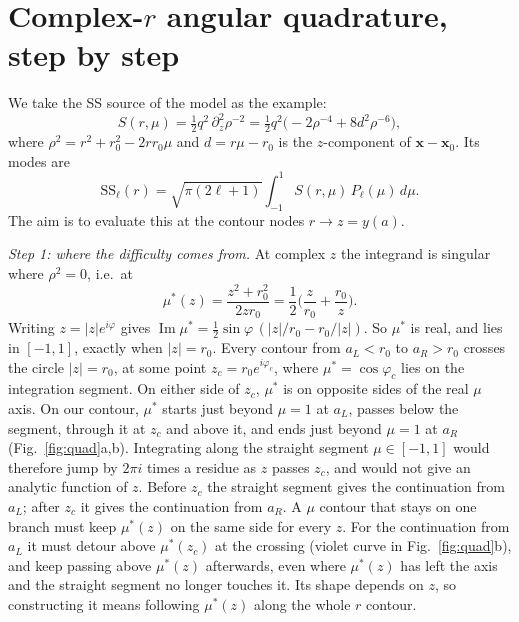 \documentclass[aps,prl,twocolumn,superscriptaddress,nofootinbib,floatfix]{revtex4-2}
\renewcommand{\Im}{\operatorname{Im}}
\newcommand{\x}{\mathbf{x}}
\begin{document}
\section{Complex-\texorpdfstring{$r$}{r} angular quadrature, step by step}\label{app:quadrature}
We take the SS source of the model as the example:
\begin{equation}
S(r,\mu)=\tfrac12q^2\,\partial_z^2\rho^{-2}=\tfrac12q^2\big(-2\rho^{-4}+8d^2\rho^{-6}\big),
\end{equation}
where $\rho^2=r^2+r_0^2-2rr_0\mu$ and $d=r\mu-r_0$ is the $z$-component of $\x-\x_0$.
Its modes are
\begin{equation}
\mathrm{SS}_\ell(r)=\sqrt{\pi(2\ell+1)}\int_{-1}^{1}S(r,\mu)\,P_\ell(\mu)\,d\mu.
\label{eq:SSmode}
\end{equation}
The aim is to evaluate this at the contour nodes $r\to z=y(a)$.

\emph{Step 1: where the difficulty comes from.}
At complex $z$ the integrand is singular where $\rho^2=0$, i.e.\ at
\begin{equation}
\mu^*(z)=\frac{z^2+r_0^2}{2zr_0}=\frac12\Big(\frac{z}{r_0}+\frac{r_0}{z}\Big).
\end{equation}
Writing $z=|z|e^{i\varphi}$ gives $\Im\mu^*=\tfrac12\sin\varphi\,(|z|/r_0-r_0/|z|)$.
So $\mu^*$ is real, and lies in $[-1,1]$, exactly when $|z|=r_0$.
Every contour from $a_L<r_0$ to $a_R>r_0$ crosses the circle $|z|=r_0$, at some point $z_c=r_0e^{i\varphi_c}$, where $\mu^*=\cos\varphi_c$ lies on the integration segment.
On either side of $z_c$, $\mu^*$ is on opposite sides of the real $\mu$ axis.
On our contour, $\mu^*$ starts just beyond $\mu=1$ at $a_L$, passes below the segment, through it at $z_c$ and above it, and ends just beyond $\mu=1$ at $a_R$ (Fig.~\ref{fig:quad}a,b).
Integrating along the straight segment $\mu\in[-1,1]$ would therefore jump by $2\pi i$ times a residue as $z$ passes $z_c$, and would not give an analytic function of $z$.
Before $z_c$ the straight segment gives the continuation from $a_L$; after $z_c$ it gives the continuation from $a_R$.
A $\mu$ contour that stays on one branch must keep $\mu^*(z)$ on the same side for every $z$.
For the continuation from $a_L$ it must detour above $\mu^*(z_c)$ at the crossing (violet curve in Fig.~\ref{fig:quad}b), and keep passing above $\mu^*(z)$ afterwards, even where $\mu^*(z)$ has left the axis and the straight segment no longer touches it.
Its shape depends on $z$, so constructing it means following $\mu^*(z)$ along the whole $r$ contour.
\end{document}
